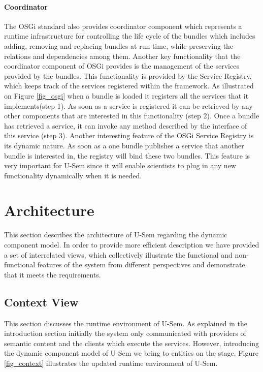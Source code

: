 \paragraph{Coordinator}
The OSGi standard also provides coordinator component which represents a runtime infrastructure for controlling the life cycle of the bundles which includes adding, removing and replacing bundles at run-time, while preserving the relations and dependencies among them. Another key functionality that the coordinator component of OSGi provides is the management of the services provided by the bundles. This functionality is provided by the Service Registry, which keeps track of the services registered within the framework. As illustrated on Figure \ref{fig_osgi} when a bundle is loaded it registers all the services that it implements(step 1). As soon as a service is registered it can be retrieved by any other components that are interested in this functionality (step 2). Once a bundle has retrieved a service, it can invoke any method described by the interface of this service (step 3). Another interesting feature of the OSGi Service Registry is its dynamic nature. As soon as a one bundle publishes a service that another bundle is interested in, the registry will bind these two bundles. This feature is very important for U-Sem since it will enable scientists to plug in any new functionality dynamically when it is needed.


\section{Architecture}
\label{sec:architecture}

This section describes the architecture of U-Sem regarding the dynamic component model. In order to provide more efficient description we have provided a set of interrelated views, which collectively illustrate the functional and non-functional features of the system from different perspectives and demonstrate that it meets the requirements.

\subsection{Context View}

This section discusses the runtime environment of U-Sem. As explained in the introduction section initially the system only communicated with providers of semantic content and the clients which execute the services. However, introducing the dynamic component model of U-Sem we bring to entities on the stage. Figure \ref{fig_context} illustrates the updated runtime environment of U-Sem.


